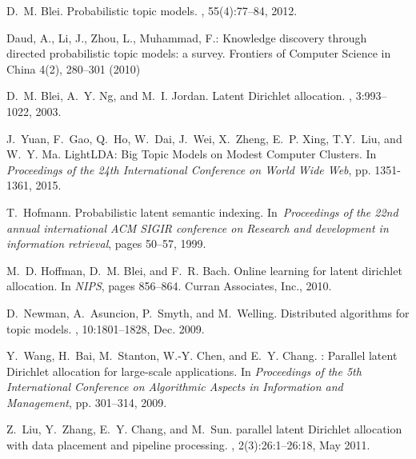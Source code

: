 \documentclass[russian,english]{llncs}
\begin{document}
\begin{thebibliography}{10}

D.~M. Blei.
\newblock Probabilistic topic models.
, 55(4):77--84, 2012.

Daud, A., Li, J., Zhou, L., Muhammad, F.: Knowledge discovery through directed
probabilistic topic models: a survey. Frontiers of Computer Science in China
4(2),  280--301 (2010)

D.~M. Blei, A.~Y. Ng, and M.~I. Jordan.
\newblock Latent {Dirichlet} allocation.
, 3:993--1022, 2003.


J.~Yuan, F.~Gao, Q.~Ho, W.~Dai, J.~Wei, X.~Zheng, E.~P. Xing, T.Y.~Liu, and W.~Y. Ma.
\newblock LightLDA: Big Topic Models on Modest Computer Clusters.
\newblock In {\em Proceedings of the 24th International Conference on World Wide Web}, pp. 1351-1361, 2015.

T.~Hofmann.
\newblock Probabilistic latent semantic indexing.
\newblock In~{\em Proceedings of the 22nd annual international ACM SIGIR
	conference on Research and development in information retrieval},
pages 50--57, 1999.

M.~D. Hoffman, D.~M. Blei, and F.~R. Bach.
\newblock Online learning for latent dirichlet allocation.
\newblock In {\em NIPS}, pages 856--864. Curran Associates, Inc., 2010.

D.~Newman, A.~Asuncion, P.~Smyth, and M.~Welling.
\newblock Distributed algorithms for topic models.
, 10:1801--1828, Dec. 2009.

Y.~Wang, H.~Bai, M.~Stanton, W.-Y. Chen, and E.~Y. Chang.
: Parallel latent {D}irichlet allocation for large-scale applications.
\newblock In {\em Proceedings of the 5th International Conference on
	Algorithmic Aspects in Information and Management}, pp. 301--314, 2009.

Z.~Liu, Y.~Zhang, E.~Y. Chang, and M.~Sun.
 parallel latent {D}irichlet allocation with data placement and pipeline processing.
, 2(3):26:1--26:18, May 2011.


\end{thebibliography}
\end{document}

